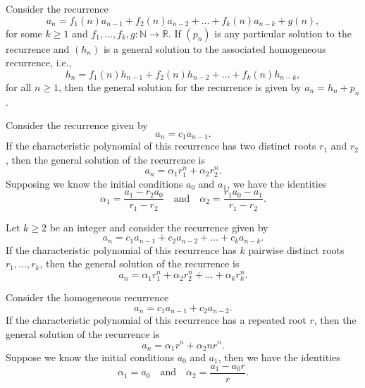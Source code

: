 \documentclass{tufte-handout}
\makeatletter
\renewcommand{\section}{\@startsection{section}%
    {3}{-1.01em}{-3ex \@plus -1ex \@minus -.2ex}%
    {1.5ex \@plus .2ex}
    {\hspace*{-5.5em}\fcolorbox{blue}{blue}{\parbox[c][1.0ex][b]{4em}{\phantom{space}}}
    \normalfont\Large\itshape\color{blue}}}
\makeatother
\begin{document}
\begin{Theorem}
    Consider the recurrence
    \[a_n = f_1(n)a_{n-1} + f_2(n)a_{n-2} + \dots +
    f_k(n)a_{n-k} + g(n),\]
    for some \( k \geq 1 \) and \( f_1, \ldots, f_k, g: \mathbb{N} \to \mathbb{R} \).
    If \( (p_n) \) is any particular solution to the recurrence
    and \( (h_n) \) is a general solution to the
    associated homogeneous recurrence, i.e.,
    \[ h_n = f_1(n)h_{n-1} + f_2(n)h_{n-2} + \dots + f_k(n)h_{n-k},\]
    for all \( n \geq 1 \), then the general solution for the recurrence is
    given by \( a_n = h_n + p_n \).
\end{Theorem}

\begin{Theorem}
    Consider the recurrence given by
    \[ a_n = c_1a_{n-1}.\]
    If the characteristic polynomial of this recurrence has two
    distinct roots \( r_1 \) and \( r_2 \), then the general solution
    of the recurrence is
    \[ a_n = \alpha_1r_1^n + \alpha_2r_2^n.\]
    Supposing we know the initial conditions \( a_0 \) and \( a_1 \),
    we have the identities
    \[\alpha_1 = \frac{a_1 - r_2a_0}{r_1 - r_2} 
    \quad \text{and} \quad \alpha_2 = \frac{r_1a_0 - a_1}{r_1 - r_2}.\]
\end{Theorem}

\begin{Theorem}
    Let \( k \geq 2 \) be an integer and consider the recurrence given by
    \[ a_n = c_1a_{n-1} + c_2a_{n-2} + \dots + c_ka_{n-k}.\]
    If the characteristic polynomial of this recurrence has \( k \) pairwise distinct roots
    \( r_1, \ldots, r_k \), then the general solution of the recurrence is
    \[ a_n = \alpha_1r_1^n + \alpha_2r_2^n + \dots + \alpha_kr_k^n.\]
\end{Theorem}

\begin{Theorem}
    Consider the homogeneous recurrence
    \[ a_n = c_1a_{n-1} + c_2a_{n-2}.\]
    If the characteristic polynomial of this recurrence has 
    a repeated root \( r \), then the general solution of
    the recurrence is
    \[ a_n = \alpha_1r^n + \alpha_2nr^n.\]
    Suppose we know the initial conditions \( a_0 \) and \( a_1 \),
    then we have the identities
    \[\alpha_1 = a_0 \quad \text{and} \quad \alpha_2 = \frac{a_1 - a_0r}{r}.\]
\end{Theorem}


\makeatletter
  \renewcommand{\section}{\@startsection{section}%
    {3}{0.8em}{-3ex \@plus -1ex \@minus -.2ex}%
    {1.5ex \@plus .2ex}
    {\hspace*{-5.5em}\fcolorbox{Periwinkle}{Periwinkle}{\parbox[c][1.0ex][b]{4em}{\phantom{space}}}
    \normalfont\Large\itshape\color{blue}}}
\makeatother



\end{document}
